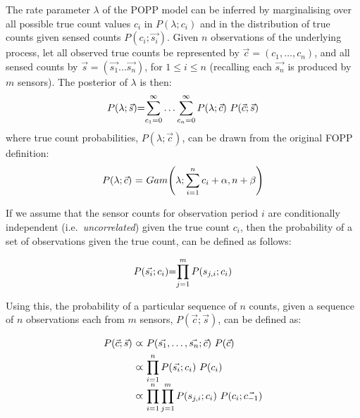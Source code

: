 The rate parameter $\lambda$ of the POPP model can be inferred by marginalising over all possible true count values $c_i$ in $P(\lambda ; c_i)$ and in the  distribution of true counts given sensed counts $P(c_i ; \vec{s_i})$. 
% 
Given $n$ observations of the underlying process, let all observed true counts be represented by $\vec{c} = (c_1, \ldots, c_n)$, and all sensed counts by $\vec{s}=(\vec{s_1} \dots \vec{s_n})$, for $1 \leq i \leq n$ (recalling each $\vec{s_n}$ is produced by $m$ sensors). 
% 
The posterior of $\lambda$ is then:
\begin{equation}
	\label{eq:marginal_occurrences}
	\begin{tabular}{r@{=}l}
		$P(\lambda ; \vec{s})$ &  $\displaystyle\sum_{c_1=0}^{\infty} \ldots \displaystyle\sum_{c_n=0}^{\infty} P(\lambda ; \vec{c}) ~ P(\vec{c} ; \vec{s})$ \\
	\end{tabular}
\end{equation}
\noindent where true count probabilities, $P(\lambda ; \vec{c})$, can be drawn from the original FOPP definition:
\begin{equation*}
	\begin{tabular}{r@{ = }l}
		$P(\lambda ; \vec{c})$ & $Gam\Bigg(\lambda ; \displaystyle\sum_{i=1}^{n} c_i + \alpha, n + \beta \Bigg)$
	\end{tabular}
\end{equation*}


If we assume that the sensor counts for observation period $i$ are conditionally independent (i.e.~\textit{uncorrelated}) given the true count $c_i$, then the probability of a set of observations given the true count, can be defined as follows: 

\begin{equation}
	\label{eq:independent_sensor_likelihood}
	\begin{tabular}{r@{=}l}
	$P(\vec{s_i} ; c_i)$ & $\displaystyle\prod_{j=1}^{m} P(s_{j,i} ; c_i)$ \\ 
	\end{tabular}
\end{equation}

Using this, the probability of a particular sequence of $n$ counts, given a sequence of $n$ observations each from $m$ sensors, $P(\vec{c} ; \vec{s})$, can be defined as:

\begin{equation}
    \label{eq:occurrences_likelihood}
    \begin{tabular}{r@{ $\varpropto$ }l}
        $P(\vec{c} ; \vec{s})$ & $P(\vec{s_1}, \ldots, \vec{s_n} ; \vec{c}) ~ P(\vec{c})$ \\ [1ex]
        & $\displaystyle\prod_{i=1}^{n} P(\vec{s_i} ; c_i) ~ P(c_i)$ \\ [2ex]
        & $\displaystyle\prod_{i=1}^{n} \displaystyle\prod_{j=1}^{m} P(s_{j,i} ; c_i) ~ P(c_i ; \vec{c_{-1}})$
    \end{tabular}
\end{equation}

